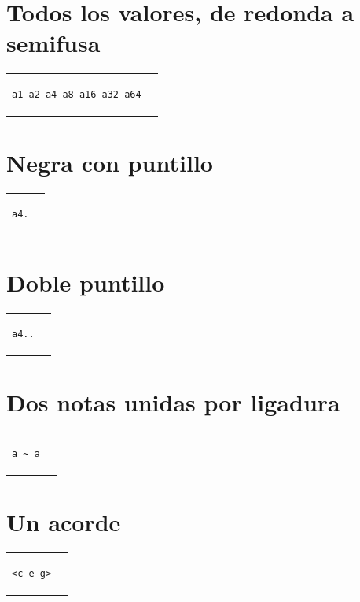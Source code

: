 \documentclass[a4paper,10pt,oneside,headinclude,titlepage]{article} %
\begin{document}
\section*{Todos los valores, de redonda a semifusa}
\begin{tabular}{m{6cm}m{2cm}}
\begin{verbatim}
a1 a2 a4 a8 a16 a32 a64
\end{verbatim}
&
\begin[fragment,relative=2,notime]{lilypond}
a1 a2 a4 a8 a16 a32 a64
\end{lilypond}
\end{tabular}

\section*{Negra con puntillo}
\begin{tabular}{m{2cm}m{2cm}}
\begin{verbatim}
a4.
\end{verbatim}
&
\begin[fragment,relative=2,notime]{lilypond}
a4.
\end{lilypond}
\end{tabular}

\section*{Doble puntillo}
\begin{tabular}{m{2cm}m{2cm}}
\begin{verbatim}
a4..
\end{verbatim}
&
\begin[fragment,relative=2,notime]{lilypond}
a4..
\end{lilypond}
\end{tabular}

\section*{Dos notas unidas por ligadura}
\begin{tabular}{m{2cm}m{2cm}}
\begin{verbatim}
a ~ a
\end{verbatim}
&
\begin[fragment,relative=2,notime]{lilypond}
a ~ a
\end{lilypond}
\end{tabular}

\section*{Un acorde}
\begin{tabular}{m{2cm}m{2cm}}
\begin{verbatim}
<c e g>
\end{verbatim}
&
\begin[fragment,relative=1,notime]{lilypond}
<c e g>
\end{lilypond}
\end{tabular}
\end{document}
